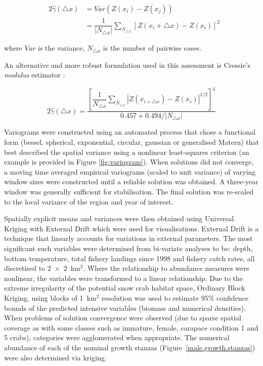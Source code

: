 \documentclass[11pt]{article}
\newcommand{\sq}{$^2$}
\newcommand{\mult}{$\times$}
\newcommand{\kmsq}{km\sq}
\begin{document}
\begin{eqnarray}
  & 2 \hat{ \gamma} (\bigtriangleup x) & = Var( Z (x_i) - Z(x_j) )  \\
  &   & = \dfrac{1} {| N_{\bigtriangleup x} |}  {\displaystyle \sum_{N_{\bigtriangleup x}}} [ Z(x_i+\bigtriangleup x) - Z(x_i) ]^2
\end{eqnarray}


where $Var$ is the variance, $N_{\bigtriangleup x}$ is the number of pairwise cases. 

An alternative and more robust formulation used in this assessment is Cressie's \emph{modulus} estimator \citep{Cressie1993}:

\begin{equation}
  2 \hat{ \gamma} (\bigtriangleup x) =  \dfrac { \left [ \dfrac{1} {N_{\bigtriangleup x}} {\displaystyle \sum_{N_{\bigtriangleup x}} } | Z(x_{i+{\bigtriangleup x}}) - Z(x_i)| ^{1/2} \right ] ^4 } { 0.457 + 0.494/ | N_{\bigtriangleup x} | }
\end{equation}

Variograms were constructed using an automated process that chose a functional form (bessel, spherical, exponential, circular, gaussian or generalised Matern) that best described the spatial variance using a nonlinear least-squares criterion (an example is provided in Figure \ref{fig:variogram}). When solutions did not converge, a moving time averaged empirical variograms (scaled to unit variance) of varying window sizes were constructed until a reliable solution was obtained. A three-year window was generally sufficient for stabilisation. The final solution was re-scaled to the local variance of the region and year of interest.

Spatially explicit means and variances were then obtained using Universal Kriging with External Drift which were used for visualisations. External Drift is a technique that linearly accounts for variations in external parameters. The most significant such variables were determined from bi-variate analyses to be: depth, bottom temperature, total fishery landings since 1998 and fishery catch rates, all discretised to 2~\mult~2~\kmsq. Where the relationship to abundance measures were nonlinear, the variables were transformed to a linear relationship. Due to the extreme irregularity of the potential snow crab habitat space, Ordinary Block Kriging, using blocks of 1~\kmsq {} resolution was used to estimate 95\% confidence bounds of the predicted intensive variables (biomass and numerical densities). When problems of solution convergence were observed (due to sparse spatial coverage as with some classes such as immature, female, carapace condition 1 and 5 crabs), categories were agglomerated when appropriate. The numerical abundance of each of the nominal growth stanzas (Figure~\ref{male.growth.stanzas}) were also determined via kriging.
\end{document}
